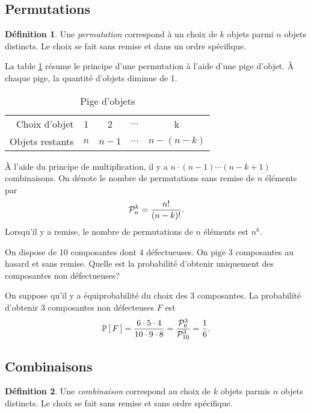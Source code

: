 \documentclass[11pt]{article}
\makeatletter
\newcommand\perm[2]{%
	\ensuremath{%
		\mathcal{P}_{#2}^{#1}%
	}%
}%
\renewcommand\P[1]{%
	\ensuremath{%
		\mathbb{P}\left[\,#1\,\right]%
	}%
}%
\theoremstyle{remark}
\theoremstyle{definition}
\newtheorem*{@definition}{Définition}
\newenvironment{definition}{%
	\begin{@definition}%
}{%
	\end{@definition}%
	\setcounter{property}{0}%
}
\makeatother
\begin{document}
\subsection{Permutations}
\begin{definition}
	Une \textit{permutation} correspond à un choix de $k$ objets parmi $n$
	objets distincts. Le choix se fait sans remise et dans un ordre spécifique.
\end{definition}

La table \ref{tb:permutation} résume le principe d'une permutation à l'aide
d'une pige d'objet. À chaque pige, la quantité d'objets diminue de 1.

\begin{table}[H]
	\centering
	\caption{Pige d'objets}
	\begin{tabular}{r|cccc}
		\toprule
		Choix d'objet   &   1 &   2   & $\dots$ & k\\
		Objets restants & $n$ & $n-1$ & $\dots$ & $n-(n-k)$\\
		\bottomrule
	\end{tabular}
	\label{tb:permutation}
\end{table}

À l'aide du principe de multiplication, il y a $n\cdot(n-1)\cdots(n-k+1)$
combinaisons. On dénote le nombre de permutations sans remise de $n$ éléments
par
\begin{equation*}
	\perm{k}{n}=\frac{n!}{(n-k)!}.
\end{equation*}
Lorsqu'il y a remise, le nombre de permutations de $n$ éléments est $n^k$.

\begin{exemple}
	On dispose de 10 composantes dont 4 défectueuses. On pige 3 composantes au
	hasard et sans remise. Quelle est la probabilité d'obtenir uniquement des
	composantes non défectueuses?

	On suppose qu'il y a équiprobabilité du choix des 3 composantes. La
	probabilité d'obtenir 3 composantes non défecteuses $F$ est
	\begin{equation*}
		\P{F}
		=\frac{6\cdot 5\cdot 4}{10\cdot 9\cdot 8}
		=\frac{\perm{3}{6}}{\perm{3}{10}}
		=\frac{1}{6}.
	\end{equation*}
\end{exemple}

\subsection{Combinaisons}
\begin{definition}
	Une \textit{combinaison} correspond au choix de $k$ objets parmis $n$
	objets distincts. Le choix se fait sans remise et sans ordre spécifique.
\end{definition}
\end{document}
